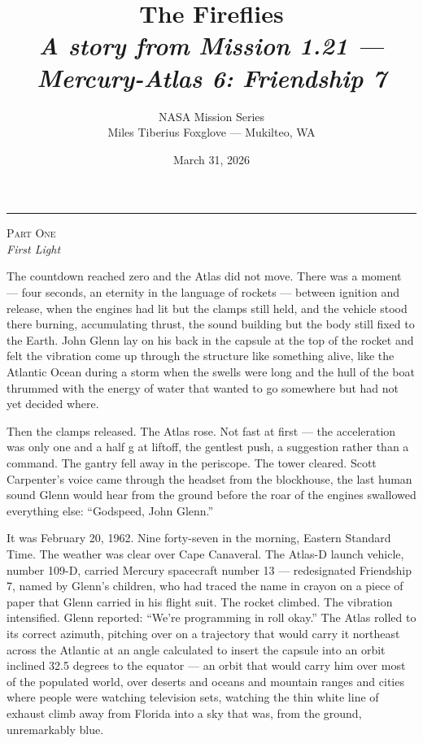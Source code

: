 \documentclass[12pt, letterpaper]{article}
\title{\Huge\textbf{The Fireflies}\\[0.5em]\large\textit{A story from Mission 1.21 --- Mercury-Atlas 6: Friendship 7}}
\author{NASA Mission Series\\[0.3em]\small Miles Tiberius Foxglove --- Mukilteo, WA}
\date{March 31, 2026}
\begin{document}
\maketitle
\thispagestyle{empty}

\vspace{1em}
\noindent\rule{\textwidth}{0.4pt}
\vspace{1em}

\begin{center}
{\small\textsc{Part One}}\\[0.3em]
{\large\textit{First Light}}
\end{center}

\vspace{1em}

\noindent The countdown reached zero and the Atlas did not move. There was a moment --- four seconds, an eternity in the language of rockets --- between ignition and release, when the engines had lit but the clamps still held, and the vehicle stood there burning, accumulating thrust, the sound building but the body still fixed to the Earth. John Glenn lay on his back in the capsule at the top of the rocket and felt the vibration come up through the structure like something alive, like the Atlantic Ocean during a storm when the swells were long and the hull of the boat thrummed with the energy of water that wanted to go somewhere but had not yet decided where.

Then the clamps released. The Atlas rose. Not fast at first --- the acceleration was only one and a half g at liftoff, the gentlest push, a suggestion rather than a command. The gantry fell away in the periscope. The tower cleared. Scott Carpenter's voice came through the headset from the blockhouse, the last human sound Glenn would hear from the ground before the roar of the engines swallowed everything else: ``Godspeed, John Glenn.''

It was February 20, 1962. Nine forty-seven in the morning, Eastern Standard Time. The weather was clear over Cape Canaveral. The Atlas-D launch vehicle, number 109-D, carried Mercury spacecraft number 13 --- redesignated Friendship 7, named by Glenn's children, who had traced the name in crayon on a piece of paper that Glenn carried in his flight suit. The rocket climbed. The vibration intensified. Glenn reported: ``We're programming in roll okay.'' The Atlas rolled to its correct azimuth, pitching over on a trajectory that would carry it northeast across the Atlantic at an angle calculated to insert the capsule into an orbit inclined 32.5 degrees to the equator --- an orbit that would carry him over most of the populated world, over deserts and oceans and mountain ranges and cities where people were watching television sets, watching the thin white line of exhaust climb away from Florida into a sky that was, from the ground, unremarkably blue.
\end{document}
